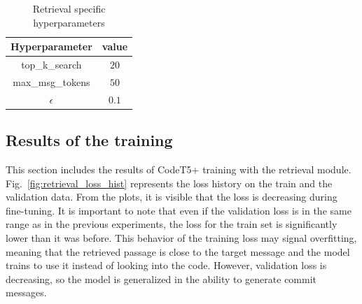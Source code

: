 \begin{table}[h]
    \centering
    \caption{Retrieval specific hyperparameters}\label{tab:retrieval_hyperparams}
    \renewcommand{\arraystretch}{1.5} %
    \begin{tabular}{| c | c |} %
    \hline
    Hyperparameter & value \\ \hline  
    top\_k\_search & $20$ \\ \hline
    max\_msg\_tokens & $50$ \\ \hline
    $\epsilon$ & $0.1$ \\ \hline
    \end{tabular}
\end{table}

\subsection{Results of the training}
This section includes the results of CodeT5+ training with the retrieval module. Fig.~\ref{fig:retrieval_loss_hist} represents the loss history on the train and the validation data. From the plots, it is visible that the loss is decreasing during fine-tuning. It is important to note that even if the validation loss is in the same range as in the previous experiments, the loss for the train set is significantly lower than it was before. This behavior of the training loss may signal overfitting, meaning that the retrieved passage is close to the target message and the model trains to use it instead of looking into the code. However, validation loss is decreasing, so the model is generalized in the ability to generate commit messages.
